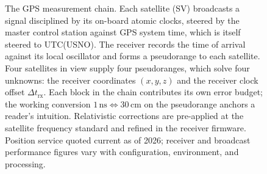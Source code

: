 \begin{figure}[p]
\caption[GPS as a measurement system]{The GPS measurement chain.
Each satellite (SV) broadcasts a signal disciplined by its on-board
atomic clocks, steered by the master control station against GPS
system time, which is itself steered to UTC(USNO). The receiver
records the time of arrival against its local oscillator and forms
a pseudorange to each satellite. Four satellites in view supply
four pseudoranges, which solve four unknowns: the receiver
coordinates $(x, y, z)$ and the receiver clock offset $\Delta
t_{\text{rx}}$. Each block in the chain contributes its own error
budget; the working conversion $1 \,\text{ns} \Leftrightarrow 30
\,\text{cm}$ on the pseudorange anchors a reader's intuition.
Relativistic corrections are pre-applied at the satellite
frequency standard and refined in the receiver firmware. Position
service quoted current as of 2026; receiver and broadcast
performance figures vary with configuration, environment, and
processing.}
\label{fig:vol01:ch06:gps-architecture}
\end{figure}
